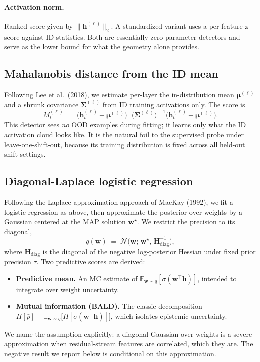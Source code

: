 \documentclass[11pt]{article}
\begin{document}
\paragraph{Activation norm.} Ranked score given by $\|\mathbf{h}^{(\ell)}\|_2$. A standardized variant uses a per-feature z-score against ID statistics. Both are essentially zero-parameter detectors and serve as the lower bound for what the geometry alone provides.

\subsection{Mahalanobis distance from the ID mean}

Following Lee et al.~(2018), we estimate per-layer the in-distribution mean $\boldsymbol{\mu}^{(\ell)}$ and a shrunk covariance $\boldsymbol{\Sigma}^{(\ell)}$ from ID training activations only. The score is
\begin{equation}
  M^{(\ell)}_t \;=\; \big(\mathbf{h}_t^{(\ell)} - \boldsymbol{\mu}^{(\ell)}\big)^{\!\top} \big(\boldsymbol{\Sigma}^{(\ell)}\big)^{\!-1} \big(\mathbf{h}_t^{(\ell)} - \boldsymbol{\mu}^{(\ell)}\big).
\end{equation}
This detector sees \emph{no} OOD examples during fitting; it learns only what the ID activation cloud looks like. It is the natural foil to the supervised probe under leave-one-shift-out, because its training distribution is fixed across all held-out shift settings.

\subsection{Diagonal-Laplace logistic regression}

Following the Laplace-approximation approach of MacKay (1992), we fit a logistic regression as above, then approximate the posterior over weights by a Gaussian centered at the MAP solution $\mathbf{w}^\star$. We restrict the precision to its diagonal,
\begin{equation}
  q(\mathbf{w}) \;=\; \mathcal{N}\!\big(\mathbf{w};\,\mathbf{w}^\star,\, \mathbf{H}_{\mathrm{diag}}^{-1}\big),
\end{equation}
where $\mathbf{H}_{\mathrm{diag}}$ is the diagonal of the negative log-posterior Hessian under fixed prior precision $\tau$. Two predictive scores are derived:
\begin{itemize}[topsep=2pt,itemsep=0pt]
  \item \textbf{Predictive mean.} An MC estimate of $\mathbb{E}_{\mathbf{w}\sim q}\!\left[\sigma(\mathbf{w}^\top \mathbf{h})\right]$, intended to integrate over weight uncertainty.
  \item \textbf{Mutual information (BALD).} The classic decomposition $H[\bar{p}] - \mathbb{E}_{\mathbf{w}\sim q}\!\big[H[\sigma(\mathbf{w}^\top\mathbf{h})]\big]$, which isolates epistemic uncertainty.
\end{itemize}
We name the assumption explicitly: a diagonal Gaussian over weights is a severe approximation when residual-stream features are correlated, which they are. The negative result we report below is conditional on this approximation.
\end{document}
